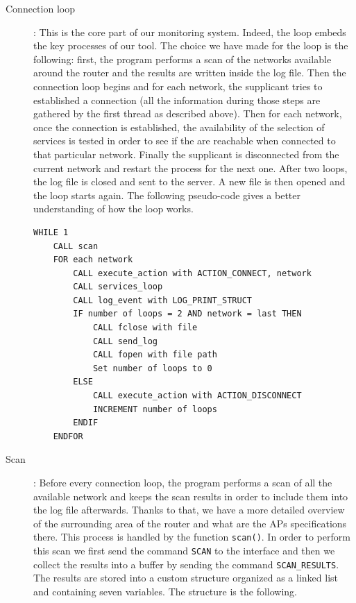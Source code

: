 \begin{description}
	\item[Connection loop]: This is the core part of our monitoring system. Indeed, the loop embeds the key processes of our tool. The choice we have made for the loop is the following: first, the program performs a scan of the networks available around the router and the results are written inside the log file. Then the connection loop begins and for each network, the supplicant tries to established a connection (all the information during those steps are gathered by the first thread as described above). Then for each network, once the connection is established, the availability of the selection of services is tested in order to see if the are reachable when connected to that particular network. Finally the supplicant is disconnected from the current network and restart the process for the next one. After two loops, the log file is closed and sent to the server. A new file is then opened and the loop starts again. The following pseudo-code gives a better understanding of how the loop works.\\

\begin{lstlisting}[frame=single,breaklines=true,caption={Connection loop pseudo-code}]
WHILE 1
	CALL scan
	FOR each network
		CALL execute_action with ACTION_CONNECT, network
		CALL services_loop
		CALL log_event with LOG_PRINT_STRUCT
		IF number of loops = 2 AND network = last THEN
			CALL fclose with file
			CALL send_log
			CALL fopen with file path
			Set number of loops to 0
		ELSE
			CALL execute_action with ACTION_DISCONNECT
			INCREMENT number of loops
		ENDIF
	ENDFOR
\end{lstlisting}

	\item[Scan]: Before every connection loop, the program performs a scan of all the available network and keeps the scan results in order to include them into the log file afterwards. Thanks to that, we have a more detailed overview of the surrounding area of the router and what are the APs specifications there. This process is handled by the function \texttt{scan()}. In order to perform this scan we first send the command \texttt{SCAN} to the interface and then we collect the results into a buffer by sending the command \texttt{SCAN\_RESULTS}. The results are stored into a custom structure organized as a linked list and containing seven variables. The structure is the following.\\


\end{description}
